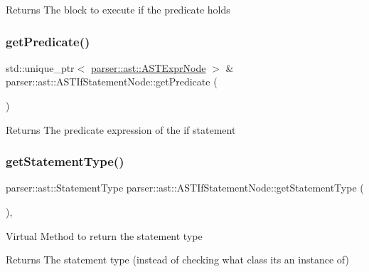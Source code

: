 \begin{DoxyReturn}{Returns}
The block to execute if the predicate holds 
\end{DoxyReturn}
\mbox{\label{classparser_1_1ast_1_1ASTIfStatementNode_a709b472f90a91edf309c77cfc5fc0b25}} 
\subsubsection{\texorpdfstring{get\+Predicate()}{getPredicate()}}
{\footnotesize\ttfamily std\+::unique\+\_\+ptr$<$ \hyperlink{classparser_1_1ast_1_1ASTExprNode}{parser\+::ast\+::\+A\+S\+T\+Expr\+Node} $>$ \& parser\+::ast\+::\+A\+S\+T\+If\+Statement\+Node\+::get\+Predicate (\begin{DoxyParamCaption}{ }\end{DoxyParamCaption})}

\begin{DoxyReturn}{Returns}
The predicate expression of the if statement 
\end{DoxyReturn}
\mbox{\label{classparser_1_1ast_1_1ASTIfStatementNode_aebe9139e5ee81c851aa01fd292635562}} 
\subsubsection{\texorpdfstring{get\+Statement\+Type()}{getStatementType()}}
{\footnotesize\ttfamily parser\+::ast\+::\+Statement\+Type parser\+::ast\+::\+A\+S\+T\+If\+Statement\+Node\+::get\+Statement\+Type (\begin{DoxyParamCaption}{ }\end{DoxyParamCaption})\hspace{0.3cm}{\ttfamily [override]}, {\ttfamily [virtual]}}

Virtual Method to return the statement type \begin{DoxyReturn}{Returns}
The statement type (instead of checking what class it\textquotesingle{}s an instance of) 
\end{DoxyReturn}


